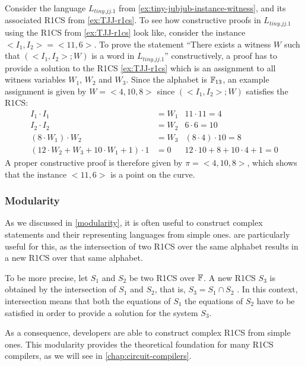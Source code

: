 \begin{example}\label{ex:tiny-jubjub-r1cs} Consider the language $L_{tiny.jj.1}$ from \examplename{} \ref{ex:tiny-jubjub-instance-witness}, and its associated R1CS from \examplename{} \ref{ex:TJJ-r1cs}. To see how constructive proofs in $L_{tiny.jj.1}$ using the R1CS from \examplename{} \ref{ex:TJJ-r1cs} look like, consider the instance $<I_1,I_2>= <11,6>$. To prove the statement ``There exists a witness $W$ such that $(<I_1,I_2>;W)$ is a word in $L_{tiny.jj.1}$'' constructively, a proof has to provide a solution to the R1CS \ref{ex:TJJ-r1cs} which is an assignment to all witness variables $W_1$, $W_2$ and $W_3$. Since the alphabet is $\mathbb{F}_{13}$, an example assignment is given by
$W=<4,10,8>$ since $(<I_1,I_2>;W)$ satisfies the R1CS:
\begin{align*}
I_1 \cdot I_1 & = W_1 & 11\cdot 11 = 4\\
I_2 \cdot I_2 & = W_2 & 6 \cdot 6 = 10 \\
(8 \cdot W_1) \cdot W_2 & = W_3 & (8\cdot 4)\cdot 10 = 8\\
(12\cdot W_2 + W_3 + 10\cdot W_1 + 1)\cdot 1 & = 0 & 12\cdot 10 + 8 + 10\cdot 4 + 1 = 0
\end{align*}
A proper constructive proof is therefore given by $\pi=<4,10,8>$, which shows that the instance $<11,6>$ is a point on the  curve. 
\end{example}
\subsubsection{Modularity}
\label{sec:R1CS_modularity} As we discussed in \ref{modularity}, it is often useful to construct complex statements and their representing languages from simple ones.  are particularly useful for this, as the intersection of two R1CS over the same alphabet results in a new R1CS over that same alphabet. 

To be more precise, let $S_1$ and $S_2$ be two R1CS over $\mathbb{F}$. A new R1CS $S_3$ is obtained by the intersection of $S_1$ and $S_2$, that is, $S_3 = S_1\cap S_2$ . In this context, intersection means that both the equations of $S_1$  the equations of $S_2$ have to be satisfied in order to provide a solution for the system $S_3$.

As a consequence, developers are able to construct complex R1CS from simple ones. This modularity provides the theoretical foundation for many R1CS compilers, as we will see in \chaptname{} \ref{chap:circuit-compilers}.

